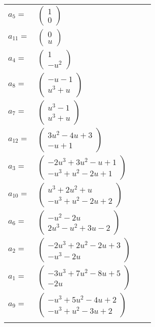 \documentclass[1p]{elsarticle_modified}
\theoremstyle{definition}
\begin{document}
\begin{tabular}{m{7pt} m{180pt} m{7pt} m{180pt} }
\flushright $a_{5}=$&$\begin{pmatrix}1\\0\end{pmatrix}$ \\
\flushright $a_{11}=$&$\begin{pmatrix}0\\u\end{pmatrix}$ \\
\flushright $a_{4}=$&$\begin{pmatrix}1\\- u^2\end{pmatrix}$ \\
\flushright $a_{8}=$&$\begin{pmatrix}- u-1\\u^3+u\end{pmatrix}$ \\
\flushright $a_{7}=$&$\begin{pmatrix}u^3-1\\u^3+u\end{pmatrix}$ \\
\flushright $a_{12}=$&$\begin{pmatrix}3 u^2-4 u+3\\- u+1\end{pmatrix}$ \\
\flushright $a_{3}=$&$\begin{pmatrix}-2 u^3+3 u^2- u+1\\- u^3+u^2-2 u+1\end{pmatrix}$ \\
\flushright $a_{10}=$&$\begin{pmatrix}u^3+2 u^2+u\\- u^3+u^2-2 u+2\end{pmatrix}$ \\
\flushright $a_{6}=$&$\begin{pmatrix}- u^2-2 u\\2 u^3- u^2+3 u-2\end{pmatrix}$ \\
\flushright $a_{2}=$&$\begin{pmatrix}-2 u^3+2 u^2-2 u+3\\- u^3-2 u\end{pmatrix}$ \\
\flushright $a_{1}=$&$\begin{pmatrix}-3 u^3+7 u^2-8 u+5\\-2 u\end{pmatrix}$ \\
\flushright $a_{9}=$&$\begin{pmatrix}- u^3+5 u^2-4 u+2\\- u^3+u^2-3 u+2\end{pmatrix}$\\&\end{tabular}
\end{document}
